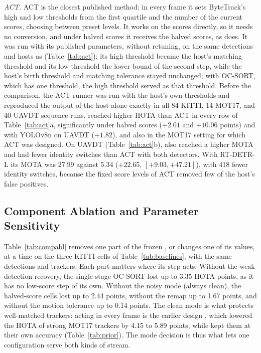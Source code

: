 \emph{ACT.} ACT \cite{act2026adaptive} is the closest published method: in every frame it sets
ByteTrack's high and low thresholds from the first quartile and the number of the current scores,
choosing between preset levels. It works on the scores directly, so it needs no conversion, and
under halved scores it receives the halved scores, as \scl{} does. It was run with its published
parameters, without retuning, on the same detections and hosts as \scl{} (Table~\ref{tab:act}):
its high threshold became the host's matching threshold and its low threshold the lower bound of
the second step, while the host's birth threshold and matching tolerance stayed unchanged; with
OC-SORT, which has one threshold, the high threshold served as that threshold. Before the
comparison, the ACT runner was run with the host's own thresholds and reproduced the output of the
host alone exactly in all 84 KITTI, 14 MOT17, and 40 UAVDT sequence runs. \scl{} reached higher HOTA
than ACT in every row of Table~\ref{tab:act}a, significantly under halved
scores ($+2.01$ and $+10.06$ points) and with YOLOv8n on UAVDT ($+1.82$), and also in the MOT17
setting for which ACT was designed. On UAVDT (Table~\ref{tab:act}b), \scl{} also reached a higher
MOTA and had fewer identity switches than ACT with both detectors. With RT-DETR-L its MOTA was 27.99
against 5.34 ($+22.65$, $[+9.03,+47.21]$), with 418 fewer identity switches, because the fixed score
levels of ACT removed few of the host's false positives.

\subsection{Component Ablation and Parameter Sensitivity}\label{sec:ablation}
Table~\ref{tab:compabl} removes one part of the frozen \scl{}, or changes one of its values, at a
time on the three KITTI cells of Table~\ref{tab:baselines}, with the same detections and trackers.
Each part matters where its step acts. Without the weak detection recovery, the single-stage
OC-SORT lost up to 3.35 HOTA points, as it has no low-score step of its own. Without the noisy mode
(always clean), the halved-score cells lost up to 2.44 points, without the remap up to 1.67 points,
and without the motion tolerance up to 0.14 points. The clean mode is what protects well-matched
trackers: acting in every frame is the earlier design \aob{}, which lowered the HOTA of strong
MOT17 trackers by 4.15 to 5.89 points, while \scl{} kept them at their own accuracy
(Table~\ref{tab:prior}). The mode decision is thus what lets one configuration serve both kinds of
stream.

